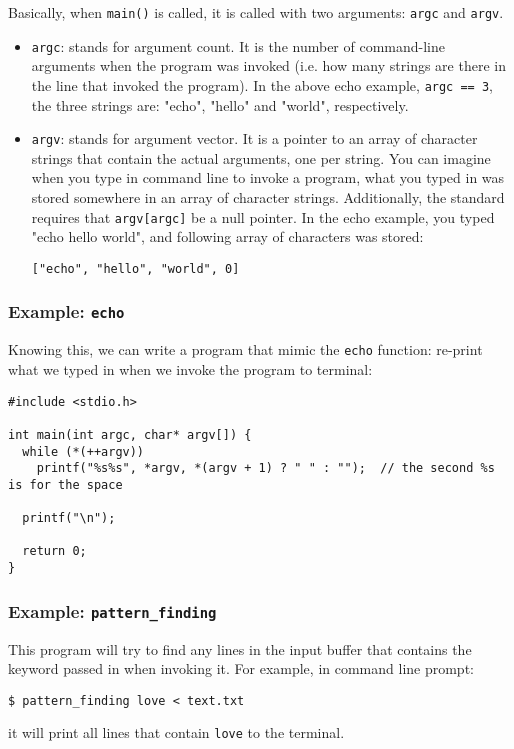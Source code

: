 \documentclass[12pt]{article}
\begin{document}
Basically, when \texttt{main()} is called, it is called with two arguments: \texttt{argc} and \texttt{argv}.
\begin{itemize}
\item \texttt{argc}: stands for argument count. It is the number of command-line arguments when the program was invoked (i.e. how many strings are there in the line that invoked the program). In the above echo example, \texttt{argc == 3}, the three strings are: "echo", "hello" and "world", respectively.
\item \texttt{argv}: stands for argument vector. It is a pointer to an array of character strings that contain the actual arguments, one per string. You can imagine when you type in command line to invoke a program, what you typed in was stored somewhere in an array of character strings. Additionally, the standard requires that \texttt{argv[argc]} be a null pointer. In the echo example, you typed "echo hello world", and following array of characters was stored:
\begin{verbatim}
["echo", "hello", "world", 0]
\end{verbatim}
\end{itemize}

\subsubsection{Example: \texttt{echo}}
\label{sec:orgc5e8c14}
Knowing this, we can write a program that mimic the \texttt{echo} function: re-print what we typed in when we invoke the program to terminal:
\begin{verbatim}
#include <stdio.h>

int main(int argc, char* argv[]) {
  while (*(++argv))
    printf("%s%s", *argv, *(argv + 1) ? " " : "");  // the second %s is for the space

  printf("\n");

  return 0;
}
\end{verbatim}

\subsubsection{Example: \texttt{pattern\_finding}}
\label{sec:org458a099}
This program will try to find any lines in the input buffer that contains the keyword passed in when invoking it. For example, in command line prompt:
\begin{verbatim}
$ pattern_finding love < text.txt
\end{verbatim}
it will print all lines that contain \texttt{love} to the terminal.
\end{document}
